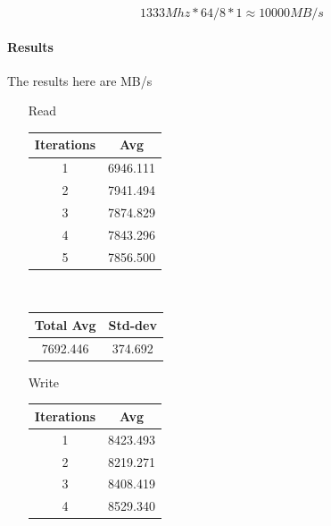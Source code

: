 \begin{equation}
    1333Mhz * 64 / 8 * 1 \approx 10000 MB/s
\end{equation}

\paragraph{Results}

The results here are MB/s

\begin{enumerate}
    \item [Read]
        \begin{center}
            \begin{tabular}{||c c||} 
             \hline
             Iterations & Avg \\ [0.5ex] 
             \hline\hline
             1 & 6946.111  \\ 
             \hline
             2 & 7941.494  \\ 
             \hline
             3 & 7874.829  \\ 
             \hline
             4 & 7843.296 \\ 
             \hline
             5 & 7856.500  \\ 
             \hline
             \hline
            \end{tabular} \\
            \begin{tabular}{||c c||} 
             \hline
             Total Avg & Std-dev \\ [0.5ex] 
             \hline\hline
             7692.446 & 374.692 \\ 
             \hline
             \hline
            \end{tabular}
        \end{center}
    \item [Write]
        \begin{center}
            \begin{tabular}{||c c||} 
                 \hline
                 Iterations & Avg \\ [0.5ex] 
                 \hline\hline
                 1 & 8423.493  \\ 
                 \hline
                 2 & 8219.271  \\ 
                 \hline
                 3 & 8408.419  \\ 
                 \hline
                 4 & 8529.340 \\ 

\end{tabular}
\end{center}
\end{enumerate}
